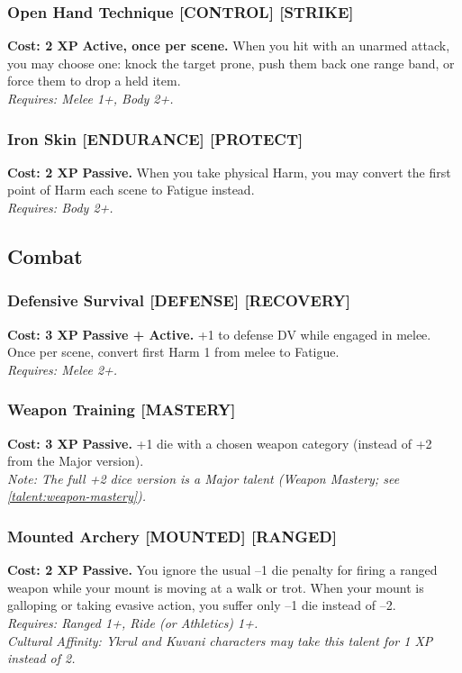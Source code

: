 \subsubsection*{Open Hand Technique \textnormal{[CONTROL] [STRIKE]}}
\label{talent:open-hand-technique}
\textbf{Cost: 2 XP} \textbf{Active, once per scene.} When you hit with an unarmed attack, you may choose one: knock the target prone, push them back one range band, or force them to drop a held item. \\
\textit{Requires: Melee 1+, Body 2+.}

\subsubsection*{Iron Skin \textnormal{[ENDURANCE] [PROTECT]}}
\label{talent:iron-skin}
\textbf{Cost: 2 XP} \textbf{Passive.} When you take physical Harm, you may convert the first point of Harm each scene to Fatigue instead. \\
\textit{Requires: Body 2+.}

\subsection*{Combat}
\label{sec:minor-combat}

\subsubsection*{Defensive Survival \textnormal{[DEFENSE] [RECOVERY]}}
\label{talent:defensive-survival}
\textbf{Cost: 3 XP} \textbf{Passive + Active.} +1 to defense DV while engaged in melee. Once per scene, convert first Harm 1 from melee to Fatigue. \\
\textit{Requires: Melee 2+.}

\subsubsection*{Weapon Training \textnormal{[MASTERY]}}
\label{talent:weapon-training}
\textbf{Cost: 3 XP} \textbf{Passive.} +1 die with a chosen weapon category (instead of +2 from the Major version). \\
\textit{Note: The full +2 dice version is a Major talent (Weapon Mastery; see \ref{talent:weapon-mastery}).}

\subsubsection*{Mounted Archery \textnormal{[MOUNTED] [RANGED]}}
\label{talent:mounted-archery}
\textbf{Cost: 2 XP} \textbf{Passive.} You ignore the usual --1 die penalty for firing a ranged weapon while your mount is moving at a walk or trot. When your mount is galloping or taking evasive action, you suffer only --1 die instead of --2. \\
\textit{Requires: Ranged 1+, Ride (or Athletics) 1+.} \\
\textit{Cultural Affinity: Ykrul and Kuvani characters may take this talent for 1 XP instead of 2.}

